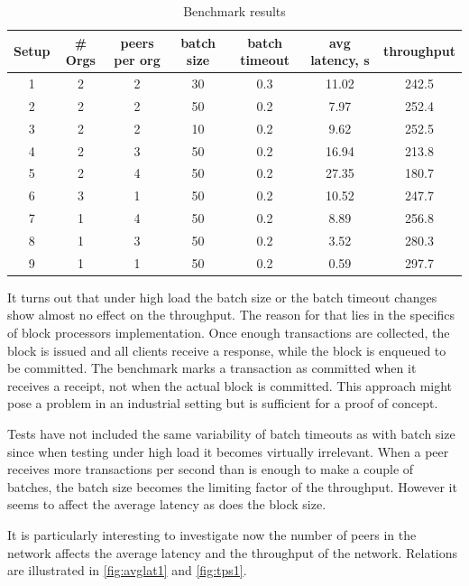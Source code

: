 \begin{table}[h!]
\begin{center}
\begin{tabular}{ c|c|c|c|c|c|c }
  Setup & \# Orgs & peers per org & batch size & batch timeout & avg latency, s & throughput \\
 \hline
 \hline
 1 & 2 & 2 & 30 & 0.3 & 11.02 & 242.5 \\
 \hline
 2 & 2 & 2 & 50 & 0.2 & 7.97 & 252.4 \\
 \hline
 3 & 2 & 2 & 10 & 0.2 & 9.62 & 252.5 \\
 \hline
 4 & 2 & 3 & 50 & 0.2 & 16.94 & 213.8 \\
 \hline
 5 & 2 & 4 & 50 & 0.2 & 27.35 & 180.7 \\
 \hline
 6 & 3 & 1 & 50 & 0.2 & 10.52 & 247.7 \\
 \hline
 7 & 1 & 4 & 50 & 0.2 & 8.89 & 256.8 \\
 \hline
 8 & 1 & 3 & 50 & 0.2 & 3.52 & 280.3 \\
 \hline
 9 & 1 & 1 & 50 & 0.2 & 0.59 & 297.7 \\
 \hline
\end{tabular}
\end{center}
\caption{Benchmark results}
\label{table:results}
\end{table}

It turns out that under high load the batch size or the batch timeout changes show almost no effect on the throughput. The reason for that lies in the specifics of block processors implementation. Once enough transactions are collected, the block is issued and all clients receive a response, while the block is enqueued to be committed. The benchmark marks a transaction as committed when it receives a receipt, not when the actual block is committed. This approach might pose a problem in an industrial setting but is sufficient for a proof of concept.

Tests have not included the same variability of batch timeouts as with batch size since when testing under high load it becomes virtually irrelevant. When a peer receives more transactions per second than is enough to make a couple of batches, the batch size becomes the limiting factor of the throughput. However it seems to affect the average latency as does the block size.

It is particularly interesting to investigate now the number of peers in the network affects the average latency and the throughput of the network. Relations are illustrated in \ref{fig:avglat1} and \ref{fig:tps1}.

